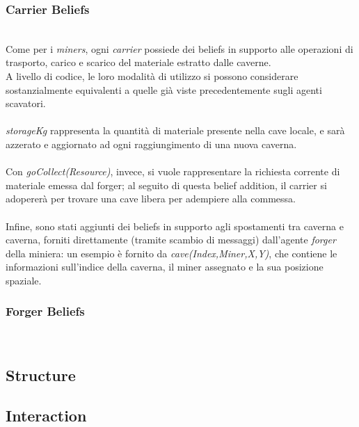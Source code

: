 \documentclass{llncs}
\begin{document}
\subsubsection{Carrier Beliefs}~
\\
Come per i \textit{miners}, ogni \textit{carrier} possiede dei beliefs in supporto alle operazioni di trasporto, carico e scarico del materiale estratto dalle caverne.\\A livello di codice, le loro modalità di utilizzo si possono considerare sostanzialmente equivalenti a quelle già viste precedentemente sugli agenti scavatori.\\\\
\textit{storageKg} rappresenta la quantità di materiale presente nella cave locale, e sarà azzerato e aggiornato ad ogni raggiungimento di una nuova caverna.\\\\
Con \textit{goCollect(Resource)}, invece, si vuole rappresentare la richiesta corrente di materiale emessa dal forger; al seguito di questa belief addition, il carrier si adopererà per trovare una cave libera per adempiere alla commessa.\\\\
Infine, sono stati aggiunti dei beliefs in supporto agli spostamenti tra caverna e caverna, forniti direttamente (tramite scambio di messaggi) dall'agente \textit{forger} della miniera: un esempio è fornito da \textit{cave(Index,Miner,X,Y)}, che contiene le informazioni sull'indice della caverna, il miner assegnato e la sua posizione spaziale.
\subsubsection{Forger Beliefs}~
\subsection{Structure}

\subsection{Interaction}
\newpage
\end{document}
